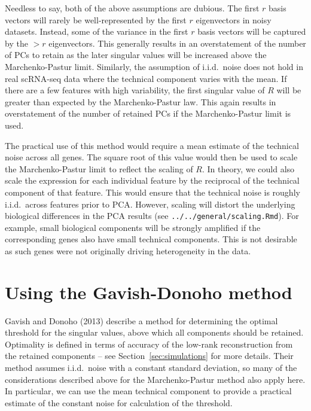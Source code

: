 \documentclass{article}
\begin{document}
Needless to say, both of the above assumptions are dubious.
The first $r$ basis vectors will rarely be well-represented by the first $r$ eigenvectors in noisy datasets.
Instead, some of the variance in the first $r$ basis vectors will be captured by the $>r$ eigenvectors.
This generally results in an overstatement of the number of PCs to retain as the later singular values will be increased above the Marchenko-Pastur limit.
Similarly, the assumption of i.i.d.\ noise does not hold in real scRNA-seq data where the technical component varies with the mean.
If there are a few features with high variability, the first singular value of $R$ will be greater than expected by the Marchenko-Pastur law.
This again results in overstatement of the number of retained PCs if the Marchenko-Pastur limit is used. 

The practical use of this method would require a mean estimate of the technical noise across all genes.
The square root of this value would then be used to scale the Marchenko-Pastur limit to reflect the scaling of $R$.
In theory, we could also scale the expression for each individual feature by the reciprocal of the technical component of that feature.
This would ensure that the technical noise is roughly i.i.d.\ across features prior to PCA.
However, scaling will distort the underlying biological differences in the PCA results (see \verb!../../general/scaling.Rmd!).
For example, small biological components will be strongly amplified if the corresponding genes also have small technical components.
This is not desirable as such genes were not originally driving heterogeneity in the data.

\section{Using the Gavish-Donoho method}
Gavish and Donoho (2013) describe a method for determining the optimal threshold for the singular values, above which all components should be retained.
Optimality is defined in terms of accuracy of the low-rank reconstruction from the retained components -- see Section~\ref{sec:simulations} for more details.
Their method assumes i.i.d.\ noise with a constant standard deviation, so many of the considerations described above for the Marchenko-Pastur method also apply here.
In particular, we can use the mean technical component to provide a practical estimate of the constant noise for calculation of the threshold.
\end{document}

